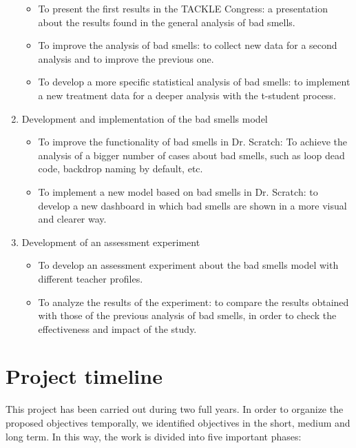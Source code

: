 \begin{enumerate}
\begin{itemize}
        \item To present the first results in the TACKLE Congress: a presentation about the results found in the general analysis of bad smells.
        \item To improve the analysis of bad smells: to collect new data for a second analysis and to improve the previous one.
        \item To develop a more specific statistical analysis of bad smells: to implement a new treatment data for a deeper analysis with the t-student process. 
    \end{itemize}
    \item Development and implementation of the bad smells model
    \begin{itemize}
        \item To improve the functionality of bad smells in Dr. Scratch: To achieve the analysis of a bigger number of cases about bad smells, such as loop dead code, backdrop naming by default, etc.
        \item To implement a new model based on bad smells in Dr. Scratch: to develop a new dashboard in which bad smells are shown in a more visual and clearer way.
    \end{itemize}
    \item Development of an assessment experiment
    \begin{itemize}
        \item To develop an assessment experiment about the bad smells model with different teacher profiles.
        \item To analyze the results of the experiment: to compare the results obtained with those of the previous analysis of bad smells, in order to check the effectiveness and impact of the study.
    \end{itemize}
\end{enumerate}



\section{Project timeline}
\label{sec:timeline-project}

This project has been carried out during two full years. In order to organize the proposed objectives temporally, we identified objectives in the short, medium and long term. In this way, the work is divided into five important phases:


